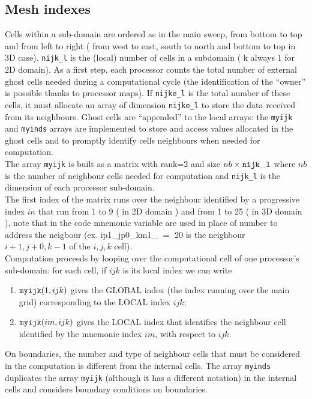 \subsection{Mesh indexes}
Cells within a sub-domain are ordered as in the main sweep, from bottom to top and
from left to right ( from west to east, south to north and bottom to top in 3D case). 
{\tt nijk\_l} is the (local) number of cells in a subdomain ( k always 1 for 2D domain).
As a first step, each processor counts the total number of external ghost cells
needed during a computational cycle (the identification of the ``owner'' is 
possible thanks to processor maps). If {\tt nijke\_l} is the total number of these 
cells, it must allocate an array of dimension {\tt nijke\_l} to store the data received
from its neighbours. Ghost cells are ``appended'' to the local arrays:
the {\tt myijk} and {\tt myinds} arrays are implemented
 to store and access values allocated in the ghost cells and to promptly
identify cells neighbours when needed for computation.\\
The array {\tt myijk} is built as a matrix with rank=2 and size 
$nb \times {\tt nijk\_l}$ where $nb$ is the number of neighbour cells 
needed for computation and {\tt nijk\_l} is the dimension of each processor
sub-domain.\\
The first index of the matrix runs over the neighbour identified by a progressive
index $in$ that run from 1 to 9 ( in 2D domain ) and from 1 to 25 ( in 3D domain ),
note that in the code mnemonic variable are used in place of number to address
the neigbour (ex. ip1\_jp0\_km1\_ $=$ 20 is the neighbour $i+1,j+0,k-1$ of the $i,j,k$
cell).\\ 
Computation proceeds by looping  over the computational
cell of one processor's sub-domain: for each cell, if $ijk$ is its local index
we can write
\begin{enumerate}
\item ${\tt myijk}( 1,ijk)$ gives the GLOBAL index (the index running 
      over the main grid) corresponding to the LOCAL index $ijk$;
\item ${\tt myijk}( im,ijk)$ gives the LOCAL index that identifies the neighbour
      cell identified by the mnemonic index $im$, with respect to $ijk$. 
\end{enumerate}

On boundaries, the number and type of neighbour cells that must be considered
in the computation is different from the internal cells. The array
{\tt myinds} duplicates the array {\tt myijk} (although it has a different notation)
in the internal cells and considers boundary conditions on boundaries.\\ 
%
